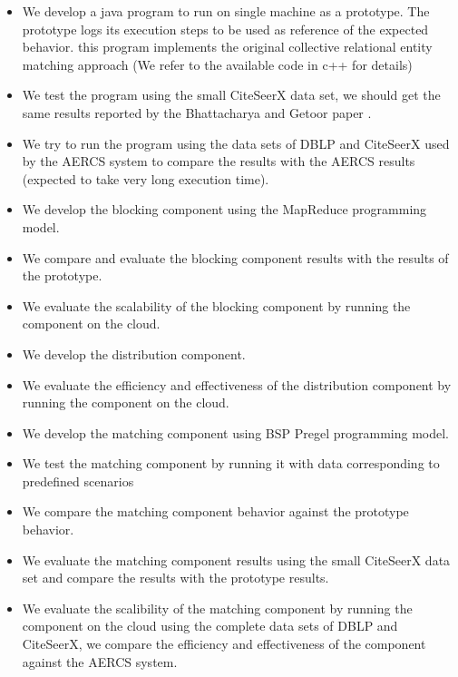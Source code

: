 \begin{itemize}
\item We develop a java program to run on single machine as a prototype. The prototype logs its execution steps to be used as reference of the expected behavior. this program implements the original collective relational entity matching approach (We refer to the available code in c++ for details)
\item We test the program using the small CiteSeerX data set, we should get the same results reported by the Bhattacharya and Getoor paper \cite{BhGe07}.
\item We try to run the program using the data sets of DBLP and CiteSeerX used by the AERCS system to compare the results with the AERCS results (expected to take very long execution time).
\item We develop the blocking component using the MapReduce programming model.
\item We compare and evaluate the blocking component results with the results of the prototype.
\item We evaluate the scalability of the blocking component by running the component on the cloud.
\item We develop the distribution component.
\item We evaluate the efficiency and effectiveness of the distribution component by running the component on the cloud.
\item We develop the matching component using BSP Pregel programming model.
\item We test the matching component by running it with data corresponding to predefined scenarios
\item We compare the matching component behavior against the prototype behavior.
\item We evaluate the matching component results using the small CiteSeerX data set and compare the results with the prototype results.
\item We evaluate the scalibility of the matching component by running the component on the cloud using the complete data sets of DBLP and CiteSeerX, we compare the efficiency and effectiveness of the component against the AERCS system. 
\end{itemize}

